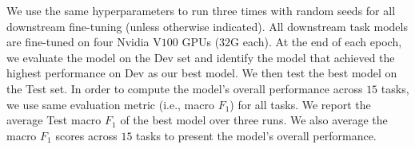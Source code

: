 
We use the same hyperparameters to run three times with random seeds for all downstream fine-tuning (unless otherwise indicated). All downstream task models are fine-tuned on four Nvidia V$100$ GPUs ($32$G each). At the end of each epoch, we evaluate the model on the Dev set and identify the model that achieved the highest performance on Dev as our best model. We then test the best model on the Test set. In order to compute the model's overall performance across $15$ tasks, we use same evaluation metric (i.e., macro $F_1$) for all tasks. We report the average Test macro $F_1$ of the best model over three runs. We also average the macro $F_1$ scores across $15$ tasks to present the model's overall performance. 